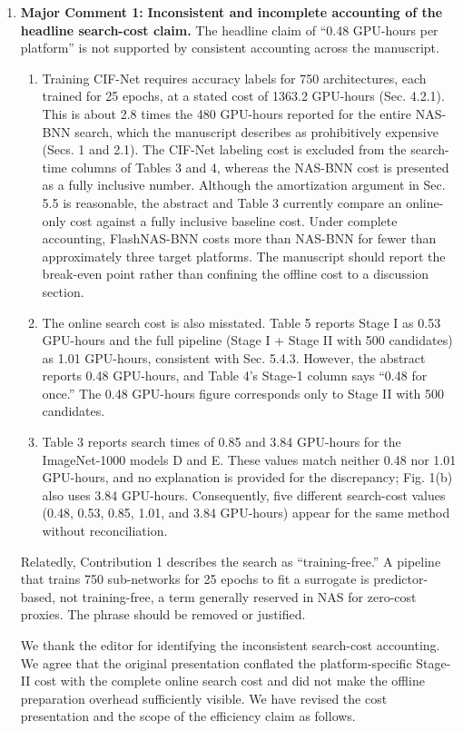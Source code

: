 \documentclass[11pt]{article}
\newcommand{\response}[1]{%
  \Needspace{3\baselineskip}%
  \par\noindent{\color{responseblue}\textbf{Response to #1:}}\par
  \vspace{1mm}\color{responseblue}}
\begin{document}
\begin{enumerate}[leftmargin=0pt,label={},itemsep=5mm]
\bfseries

\item[]\textbf{Major Comment 1:} \textbf{Inconsistent and incomplete accounting of the headline search-cost claim.}
The headline claim of ``0.48 GPU-hours per platform'' is not supported by consistent accounting across the manuscript.
\begin{enumerate}[label=(\alph*),leftmargin=2em,itemsep=2mm]
  \item Training CIF-Net requires accuracy labels for 750 architectures, each trained for 25 epochs, at a stated cost of 1363.2 GPU-hours (Sec. 4.2.1). This is about 2.8 times the 480 GPU-hours reported for the entire NAS-BNN search, which the manuscript describes as prohibitively expensive (Secs. 1 and 2.1). The CIF-Net labeling cost is excluded from the search-time columns of Tables 3 and 4, whereas the NAS-BNN cost is presented as a fully inclusive number. Although the amortization argument in Sec. 5.5 is reasonable, the abstract and Table 3 currently compare an online-only cost against a fully inclusive baseline cost. Under complete accounting, FlashNAS-BNN costs more than NAS-BNN for fewer than approximately three target platforms. The manuscript should report the break-even point rather than confining the offline cost to a discussion section.
  \item The online search cost is also misstated. Table 5 reports Stage I as 0.53 GPU-hours and the full pipeline (Stage I + Stage II with 500 candidates) as 1.01 GPU-hours, consistent with Sec. 5.4.3. However, the abstract reports 0.48 GPU-hours, and Table 4's Stage-1 column says ``0.48 for once.'' The 0.48 GPU-hours figure corresponds only to Stage II with 500 candidates.
  \item Table 3 reports search times of 0.85 and 3.84 GPU-hours for the ImageNet-1000 models D and E. These values match neither 0.48 nor 1.01 GPU-hours, and no explanation is provided for the discrepancy; Fig. 1(b) also uses 3.84 GPU-hours. Consequently, five different search-cost values (0.48, 0.53, 0.85, 1.01, and 3.84 GPU-hours) appear for the same method without reconciliation.
\end{enumerate}
Relatedly, Contribution 1 describes the search as ``training-free.'' A pipeline that trains 750 sub-networks for 25 epochs to fit a surrogate is predictor-based, not training-free, a term generally reserved in NAS for zero-cost proxies. The phrase should be removed or justified.
\response{Major Comment 1}
\begingroup
\normalfont\color{responseblue}
We thank the editor for identifying the inconsistent search-cost accounting. We agree that the original presentation conflated the platform-specific Stage-II cost with the complete online search cost and did not make the offline preparation overhead sufficiently visible. We have revised the cost presentation and the scope of the efficiency claim as follows.


\end{enumerate}
\end{document}
